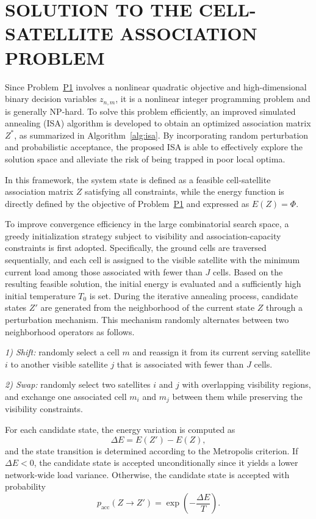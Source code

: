 \documentclass[journal]{IEEEtran}
\begin{document}
\section{SOLUTION TO THE CELL-SATELLITE ASSOCIATION PROBLEM}
\label{sec:association-solution}
Since Problem~\hyperref[prob:p1]{P1} involves a nonlinear quadratic objective and high-dimensional binary decision variables $z_{n,m}$, it is a nonlinear integer programming problem and is generally NP-hard. To solve this problem efficiently, an improved simulated annealing (ISA) algorithm is developed to obtain an optimized association matrix $Z^*$, as summarized in Algorithm~\ref{alg:isa}. By incorporating random perturbation and probabilistic acceptance, the proposed ISA is able to effectively explore the solution space and alleviate the risk of being trapped in poor local optima.

In this framework, the system state is defined as a feasible cell-satellite association matrix $Z$ satisfying all constraints, while the energy function is directly defined by the objective of Problem~\hyperref[prob:p1]{P1} and expressed as $E(Z)=\Phi$.

To improve convergence efficiency in the large combinatorial search space, a greedy initialization strategy subject to visibility and association-capacity constraints is first adopted. Specifically, the ground cells are traversed sequentially, and each cell is assigned to the visible satellite with the minimum current load among those associated with fewer than $J$ cells. Based on the resulting feasible solution, the initial energy is evaluated and a sufficiently high initial temperature $T_0$ is set. During the iterative annealing process, candidate states $Z'$ are generated from the neighborhood of the current state $Z$ through a perturbation mechanism. This mechanism randomly alternates between two neighborhood operators as follows.

\textit{1) Shift:} randomly select a cell $m$ and reassign it from its current serving satellite $i$ to another visible satellite $j$ that is associated with fewer than $J$ cells.

\textit{2) Swap:} randomly select two satellites $i$ and $j$ with overlapping visibility regions, and exchange one associated cell $m_i$ and $m_j$ between them while preserving the visibility constraints.

For each candidate state, the energy variation is computed as
\begin{equation}
\Delta E=E(Z')-E(Z),
\label{eq:isa-delta}
\end{equation}
and the state transition is determined according to the Metropolis criterion. If $\Delta E<0$, the candidate state is accepted unconditionally since it yields a lower network-wide load variance. Otherwise, the candidate state is accepted with probability
\begin{equation}
p_{\mathrm{acc}}(Z\!\rightarrow\!Z')=\exp\left(-\frac{\Delta E}{T}\right).
\label{eq:isa-metropolis}
\end{equation}
\end{document}
